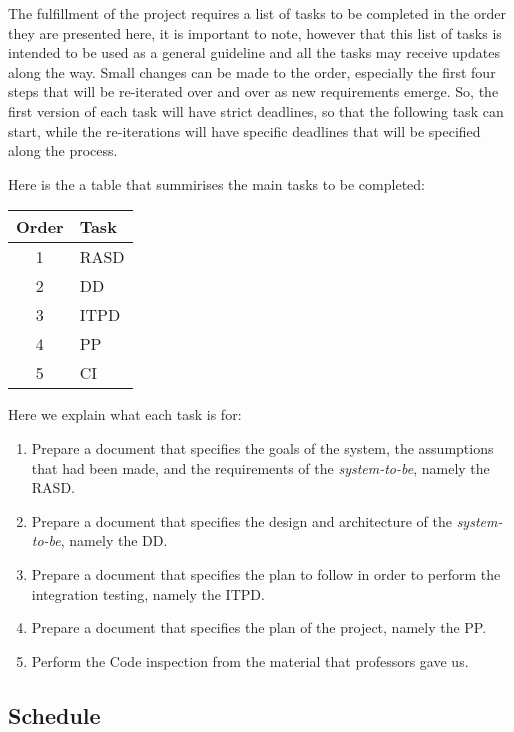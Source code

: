 The fulfillment of the project requires a list of tasks to be completed in the order they are presented here, it is important to note, however that this list of tasks is intended to be used as a general guideline and all the tasks may receive updates along the way.
Small changes can be made to the order, especially the first four steps that will be re-iterated over and over as new requirements emerge.
So, the first version of each task will have strict deadlines, so that the following task can start, while the re-iterations will have specific deadlines that will be specified along the process.

Here is the a table that summirises the main tasks to be completed:
\begin{center}
\begin{tabular}{ |c|l| } \hline
	\textbf{Order} & \textbf{Task} \\ \hline
	1 & RASD \\ \hline
	2 & DD \\ \hline
	3 & ITPD \\ \hline
	4 & PP \\ \hline
	5 & CI \\ \hline
\end{tabular}
\end{center}

Here we explain what each task is for:

\begin{enumerate}
	\item Prepare a document that specifies the goals of the system, the assumptions that had been made, and the requirements of the \emph{system-to-be}, namely the RASD.
	\item Prepare a document that specifies the design and architecture of the \emph{system-to-be}, namely the DD.
	\item Prepare a document that specifies the plan to follow in order to perform the integration testing, namely the ITPD.
	\item Prepare a document that specifies the plan of the project, namely the PP.
	\item Perform the Code inspection from the material that professors gave us.
\end{enumerate}

\subsection{Schedule} %
\label{sub:schedule}

